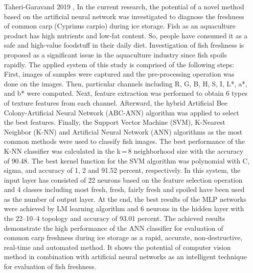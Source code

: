 Taheri-Garavand 2019 \cite{TaheriGaravand2019RealtimeNM},
In the current research, the potential of a novel method based on the artificial neural network was investigated to diagnose the freshness of common carp (Cyprinus carpio) during ice storage. Fish as an aquaculture product has high nutrients and low-fat content. So, people have consumed it as a safe and high-value foodstuff in their daily diet. Investigation of fish freshness is proposed as a significant issue in the aquaculture industry since fish spoils rapidly. The applied system of this study is comprised of the following steps: First, images of samples were captured and the pre-processing operation was done on the images. Then, particular channels including R, G, B, H, S, I, L*, a*, and b* were computed. Next, feature extraction was performed to obtain 6 types of texture features from each channel. Afterward, the hybrid Artificial Bee Colony-Artificial Neural Network (ABC-ANN) algorithm was applied to select the best features. Finally, the Support Vector Machine (SVM), K-Nearest Neighbor (K-NN) and Artificial Neural Network (ANN) algorithms as the most common methods were used to classify fish images. The best performance of the K-NN classifier was calculated in the k = 8 neighborhood size with the accuracy of 90.48. The best kernel function for the SVM algorithm was polynomial with C, sigma, and accuracy of 1, 2 and 91.52 percent, respectively. In this system, the input layer has consisted of 22 neurons based on the feature selection operation and 4 classes including most fresh, fresh, fairly fresh and spoiled have been used as the number of output layer. At the end, the best results of the MLP networks were achieved by LM learning algorithm and 6 neurons in the hidden layer with the 22–10–4 topology and accuracy of 93.01 percent. The achieved results demonstrate the high performance of the ANN classifier for evaluation of common carp freshness during ice storage as a rapid, accurate, non-destructive, real-time and automated method. It shows the potential of computer vision method in combination with artificial neural networks as an intelligent technique for evaluation of fish freshness.

